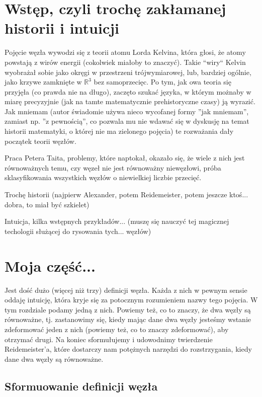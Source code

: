 \section{Wstęp, czyli trochę zakłamanej historii i intuicji}
Pojęcie węzła wywodzi się z teorii atomu Lorda Kelvina, która głosi, że atomy powstają z wirów energii (cokolwiek miałoby to znaczyć). Takie ``wiry`` Kelvin 
wyobrażał sobie jako okręgi w przestrzeni trójwymiarowej, lub, bardziej ogólnie, jako krzywe zamknięte w $\mathbb{R}^3$ bez samoprzecięc. Po tym, jak owa teoria się przyjęła 
(co prawda nie na długo), zaczęto szukać języka, w którym możnaby w miarę precyzyjnie (jak na tamte matematycznie prehistoryczne czasy) ją wyrazić. Jak mniemam (autor świadomie
używa nieco wycofanej formy ''jak mniemam'', zamiast np. ''z pewnością'', co pozwala mu nie wdawać się w dyskusję na temat historii matematyki, o której nie ma zielonego pojęcia)
te rozważania dały początek teorii węzłów. 

Praca Petera Taita, problemy, które naptokał, okazało się, że wiele z nich jest równoważnych temu, czy węzeł nie jest równoważny niewęzłowi, próba sklasyfikowania wszystkich 
węzłów o niewielkiej liczbie przecięć.

Trochę historii (najpierw Alexander, potem Reidemeister, potem jeszcze ktoś... dobra, to miał być szkielet)

Intuicja, kilka wstępnych przykładów... (muszę się nauczyć tej magicznej techologii służącej do rysowania tych... węzłów)



\section{Moja część...}

Jest dość dużo (więcej niż trzy) definicji węzła. Każda z nich w pewnym sensie oddaję intuicję, która kryje się za potocznym rozumieniem nazwy tego pojęcia. W tym rozdziale podamy 
jedną z nich. Powiemy też, co to znaczy, że dwa węzły są równoważne, tj. zastanowimy się, kiedy mając dane dwa węzły jesteśmy wstanie zdeformować jeden z nich (powiemy też, co to znaczy zdeformować), 
aby otrzymać drugi. Na koniec sformułujemy i udowodnimy twierdzenie Reidemeister'a, które dostarczy nam potężnych narzędzi do rozstrzygania, kiedy dane dwa węzły są równoważne.

\subsection{Sformuowanie definicji węzła}

